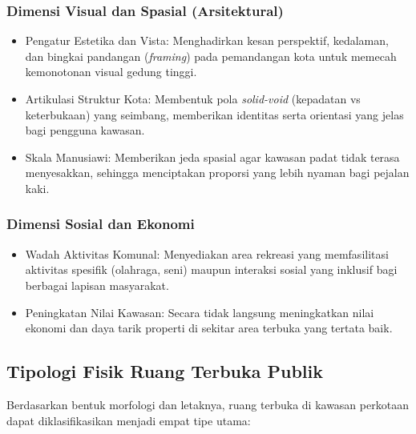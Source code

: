 \documentclass[../rumukota.tex]{subfiles}
\begin{document}
\subsubsection{Dimensi Visual dan Spasial (Arsitektural)}
\begin{itemize}
	\item Pengatur Estetika dan Vista: Menghadirkan kesan perspektif, kedalaman, dan bingkai pandangan (\textit{framing}) pada pemandangan kota untuk memecah kemonotonan visual gedung tinggi.
	\item Artikulasi Struktur Kota: Membentuk pola \textit{solid-void} (kepadatan vs keterbukaan) yang seimbang, memberikan identitas serta orientasi yang jelas bagi pengguna kawasan.
	\item Skala Manusiawi: Memberikan jeda spasial agar kawasan padat tidak terasa menyesakkan, sehingga menciptakan proporsi yang lebih nyaman bagi pejalan kaki.
\end{itemize}

\subsubsection{Dimensi Sosial dan Ekonomi}
\begin{itemize}
	\item Wadah Aktivitas Komunal: Menyediakan area rekreasi yang memfasilitasi aktivitas spesifik (olahraga, seni) maupun interaksi sosial yang inklusif bagi berbagai lapisan masyarakat.
	\item Peningkatan Nilai Kawasan: Secara tidak langsung meningkatkan nilai ekonomi dan daya tarik properti di sekitar area terbuka yang tertata baik.
\end{itemize}

\subsection{Tipologi Fisik Ruang Terbuka Publik}
Berdasarkan bentuk morfologi dan letaknya, ruang terbuka di kawasan perkotaan dapat diklasifikasikan menjadi empat tipe utama:
\end{document}
